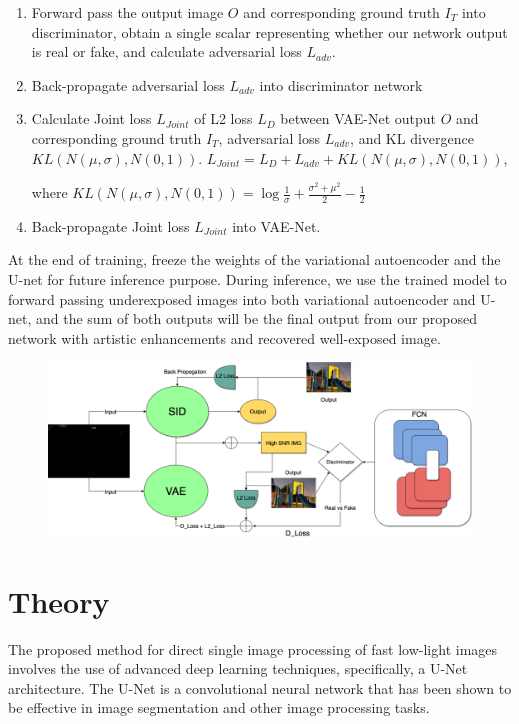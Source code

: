 \documentclass{article}
\begin{document}
\begin{enumerate}
    \item Forward pass the output image $O$ and corresponding ground truth $I_T$ into discriminator, obtain a single scalar representing whether our network output is real or fake, and calculate adversarial loss $L_{adv}$.

    \item Back-propagate adversarial loss $L_{adv}$ into discriminator network

    \item Calculate Joint loss $L_{Joint}$ of L2 loss $L_{D}$ between VAE-Net output $O$ and corresponding ground truth $I_T$, adversarial loss $L_{adv}$, and KL divergence $KL(N(\mu, \sigma), N(0, 1))$. $L_{Joint} = L_{D} + L_{adv} + KL(N(\mu, \sigma), N(0, 1))$, 
    
    where $KL(N(\mu, \sigma), N(0, 1)) = \log \frac{1}{\sigma} + \frac{\sigma^2 + \mu^2}{2} - \frac{1}{2}$ \cite{PytorchVAE}

    \item Back-propagate Joint loss $L_{Joint}$ into VAE-Net.

    \end{enumerate}

    
    At the end of training, freeze the weights of the variational autoencoder and the U-net for future inference purpose.
    During inference, we use the trained model to forward passing underexposed images into both variational autoencoder and U-net, and the sum of both outputs will be the final output from our proposed network with artistic enhancements and recovered well-exposed image.
    
\begin{figure}[h]
  \centering
  \includegraphics[width=\textwidth]{VAE Diagram.drawio.png}
\end{figure}



\section{Theory}
The proposed method for direct single image processing of fast low-light images involves the use of advanced deep learning techniques, specifically, a U-Net architecture. The U-Net is a convolutional neural network that has been shown to be effective in image segmentation \cite{UNetBasedMedicalImageSegmentation} and other image processing tasks. 
\end{document}
